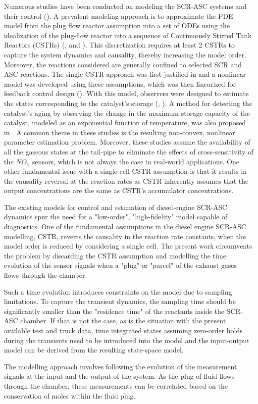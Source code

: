 Numerous studies have been conducted on modeling the SCR-ASC systems and their control (\cite{yuan2015diesel}). A
prevalent modeling approach is to approximate the PDE model from the plug flow reactor assumption into a set of ODEs
using the idealization of the plug-flow reactor into a sequence of Continuously Stirred Tank Reactors (CSTRs)
(\cite{hsieh2011development}, and \cite{nova2014urea}). This discretization requires at least 2 CSTRs to capture the
system dynamics and causality, thereby increasing the model order. Moreover, the reactions considered are generally
confined to selected SCR and ASC reactions. The single CSTR approach was first justified in
\cite{devarakonda2008adequacy} and a nonlinear model was developed using these assumptions, which was then linearized
for feedback control design (\cite{devarakonda2009model}). With this model, observers were designed to estimate the
states corresponding to the catalyst's storage (\cite{ma2017observer}, \cite{jain2020term}). A method for detecting the
catalyst's aging by observing the change in the maximum storage capacity of the catalyst, modeled as an exponential
function of temperature, was also proposed in \cite{ma2017observer}. A common theme in these studies is the resulting
non-convex, nonlinear parameter estimation problem. Moreover, these studies assume the availability of all the gaseous
states at the tail-pipe to eliminate the effects of cross-sensitivity of the $NO_x$ sensors, which is not always the
case in real-world applications. One other fundamental issue with a single cell CSTR assumption is that it results in
the causality reversal at the reaction rates as CSTR inherently assumes that the output concentrations are the same as
CSTR's accumulator concentrations.

The existing models for control and estimation of diesel-engine SCR-ASC dynamics spur the need for a "low-order",
"high-fidelity" model capable of diagnostics. One of the fundamental assumptions in the diesel engine SCR-ASC modelling,
CSTR, reverts the causality in the reaction rate constants, when the model order is reduced by considering a single
cell. The present work circumvents the problem by discarding the CSTR assumption and modelling the time evolution of the
sensor signals when a "plug" or "parcel" of the exhaust gases flows through the chamber.

Such a time evolution introduces constraints on the model due to sampling limitations. To capture the transient
dynamics, the sampling time should be significantly smaller than the "residence time" of the reactants inside the
SCR-ASC chamber. If that is not the case, as is the situation with the present available test and truck data, time
integrated states assuming zero-order holds during the transients need to be introduced into the model and the
input-output model can be derived from the resulting state-space model.

The modelling approach involves following the evolution of the measurement signals at the input and the output of the
system. As the plug of fluid flows through the chamber, these measurements can be correlated based on the conservation
of moles within the fluid plug.
